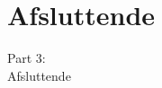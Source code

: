\documentclass[t, aspectratio=169]{beamer}
\begin{document}


%  
%  

\section{Afsluttende}
\begin{frame}
  \vspace{25mm}
  \begin{center}
    \Huge{Part 3:\\Afsluttende}
  \end{center}
\end{frame}
\end{document}
